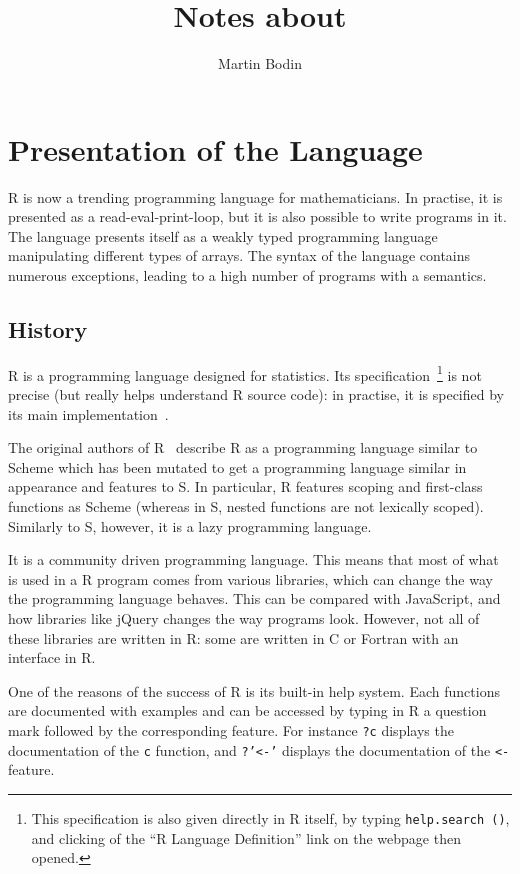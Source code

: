 \documentclass{article}
\title{Notes about \R}
\author{Martin Bodin}
\newcommand\R{R}
\newcommand\Cn{C}
\begin{document}
\maketitle

\section{Presentation of the Language}
\label{sec:presentation}

\R{} is now a trending programming language for mathematicians.
In practise, it is presented as a read-eval-print-loop,
but it is also possible to write programs in it.
The language presents itself as a weakly typed programming language
manipulating different types of arrays.
The syntax of the language contains numerous exceptions,
leading to a high number of programs with a semantics.

\subsection{History}
\label{sec:history}

\R{} is a programming language designed for statistics.
Its specification~\parencite{team2000r}\footnote{
    This specification is also given directly in \R{} itself,
    by typing \texttt{help.search ()},
    and clicking of the “\R{} Language Definition” link
    on the webpage then opened.
} is not precise (but really helps understand \R{} source code):
in practise, it is specified by its main implementation~\parencite{Rwebsite}.

The original authors of \R{}~\parencite{ihaka1996r}
describe \R{} as a programming language similar to Scheme
which has been mutated to get a programming language similar
in appearance and features to S.
In particular, \R{} features scoping and first-class functions
as Scheme
(whereas in S, nested functions are not lexically scoped).
Similarly to S, however, it is a lazy programming language.

It is a community driven programming language.
This means that most of what is used in a \R{} program comes from various libraries,
which can change the way the programming language behaves.
This can be compared with JavaScript,
and how libraries like jQuery changes the way programs look.
However, not all of these libraries are written in \R{}:
some are written in \Cn{} or Fortran
with an interface in \R{}.

One of the reasons of the success of \R{}
is its built-in help system.
Each functions are documented with examples
and can be accessed by typing in \R{}
a question mark followed by the corresponding feature.
For instance \texttt{?c} displays
the documentation of the \texttt{c} function,
and \texttt{?'<-'} displays the documentation
of the \texttt{<-} feature.
\end{document}
